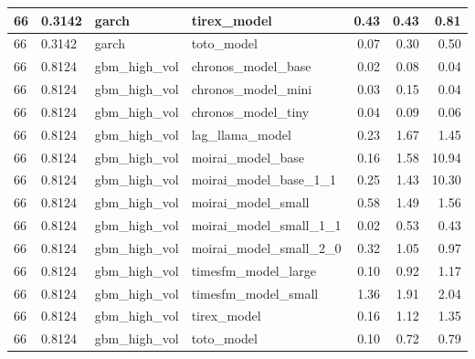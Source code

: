 {\begin{tabular}{llllrrr}
66 & 0.3142 & garch & tirex\_model & 0.43 & 0.43 & 0.81 \\
\midrule
66 & 0.3142 & garch & toto\_model & 0.07 & 0.30 & 0.50 \\
\midrule
66 & 0.8124 & gbm\_high\_vol & chronos\_model\_base & 0.02 & 0.08 & 0.04 \\
\midrule
66 & 0.8124 & gbm\_high\_vol & chronos\_model\_mini & 0.03 & 0.15 & 0.04 \\
\midrule
66 & 0.8124 & gbm\_high\_vol & chronos\_model\_tiny & 0.04 & 0.09 & 0.06 \\
\midrule
66 & 0.8124 & gbm\_high\_vol & lag\_llama\_model & 0.23 & 1.67 & 1.45 \\
\midrule
66 & 0.8124 & gbm\_high\_vol & moirai\_model\_base & 0.16 & 1.58 & 10.94 \\
\midrule
66 & 0.8124 & gbm\_high\_vol & moirai\_model\_base\_1\_1 & 0.25 & 1.43 & 10.30 \\
\midrule
66 & 0.8124 & gbm\_high\_vol & moirai\_model\_small & 0.58 & 1.49 & 1.56 \\
\midrule
66 & 0.8124 & gbm\_high\_vol & moirai\_model\_small\_1\_1 & 0.02 & 0.53 & 0.43 \\
\midrule
66 & 0.8124 & gbm\_high\_vol & moirai\_model\_small\_2\_0 & 0.32 & 1.05 & 0.97 \\
\midrule
66 & 0.8124 & gbm\_high\_vol & timesfm\_model\_large & 0.10 & 0.92 & 1.17 \\
\midrule
66 & 0.8124 & gbm\_high\_vol & timesfm\_model\_small & 1.36 & 1.91 & 2.04 \\
\midrule
66 & 0.8124 & gbm\_high\_vol & tirex\_model & 0.16 & 1.12 & 1.35 \\
\midrule
66 & 0.8124 & gbm\_high\_vol & toto\_model & 0.10 & 0.72 & 0.79 \\
\bottomrule
\end{tabular}
}